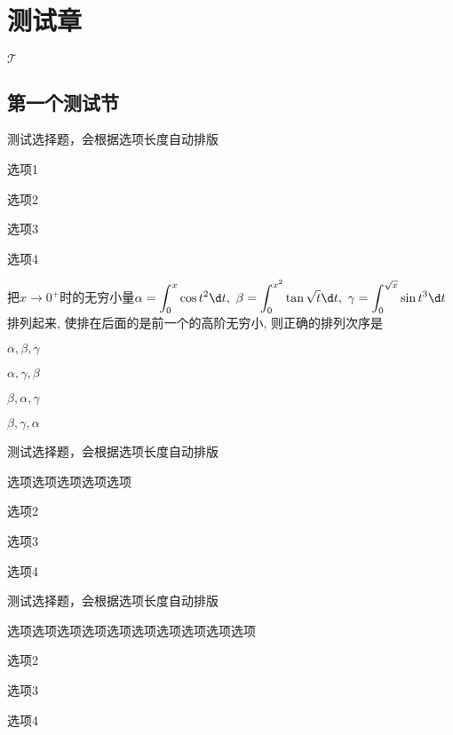 
\chapter{测试章}

$\mathscr{T}$

\section{第一个测试节}

\begin{exercise}[date=2022-03]
  测试选择题，会根据选项长度自动排版 \paren
  \begin{choices}
    \item 选项1
    \item 选项2
    \item 选项3
    \item 选项4
  \end{choices}
\end{exercise}

\begin{exercise}
  把$x\to0^{+}$时的无穷小量$\displaystyle\alpha=\int_0^x\cos t^2 \d t, \ \beta=\int_0^{x^2}\tan\sqrt{t} \d t,\ \gamma=\int_0^{\sqrt{x}}\sin t^3 \d t$ 排列起来, 使排在后面的是前一个的高阶无穷小, 则正确的排列次序是 \paren
  \begin{choices}
    \item $\alpha, \beta, \gamma$
    \item $\alpha, \gamma, \beta$
    \item $\beta, \alpha, \gamma$
    \item $\beta, \gamma, \alpha$
  \end{choices}
\end{exercise}

\begin{exercise}
  测试选择题，会根据选项长度自动排版 \paren
  \begin{choices}
    \item 选项选项选项选项选项
    \item 选项2
    \item 选项3
    \item 选项4
  \end{choices}
\end{exercise}

\begin{exercise}
  测试选择题，会根据选项长度自动排版 \paren
  \begin{choices}
    \item 选项选项选项选项选项选项选项选项选项选项
    \item 选项2
    \item 选项3
    \item 选项4
  \end{choices}
\end{exercise}

